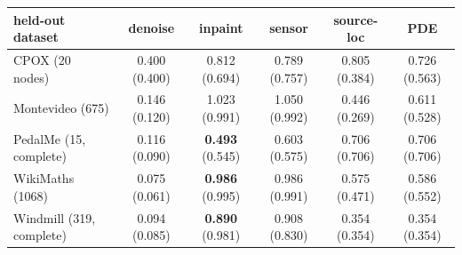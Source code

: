 \begin{tabular}{lccccc}
\toprule
held-out dataset & denoise & inpaint & sensor & source-loc & PDE \\
\midrule
CPOX (20 nodes) & 0.400 (0.400) & 0.812 (0.694) & 0.789 (0.757) & 0.805 (0.384) & 0.726 (0.563) \\
Montevideo (675) & 0.146 (0.120) & 1.023 (0.991) & 1.050 (0.992) & 0.446 (0.269) & 0.611 (0.528) \\
PedalMe (15, complete) & 0.116 (0.090) & \textbf{0.493} (0.545) & 0.603 (0.575) & 0.706 (0.706) & 0.706 (0.706) \\
WikiMaths (1068) & 0.075 (0.061) & \textbf{0.986} (0.995) & 0.986 (0.991) & 0.575 (0.471) & 0.586 (0.552) \\
Windmill (319, complete) & 0.094 (0.085) & \textbf{0.890} (0.981) & 0.908 (0.830) & 0.354 (0.354) & 0.354 (0.354) \\
\bottomrule
\end{tabular}
